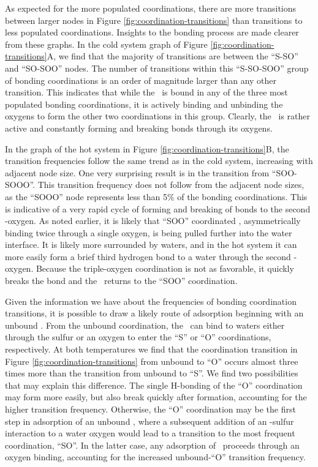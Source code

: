 As expected for the more populated coordinations, there are more transitions between larger nodes in Figure \ref{fig:coordination-transitions} than transitions to less populated coordinations. Insights to the bonding process are made clearer from these graphs. In the cold system graph of Figure \ref{fig:coordination-transitions}A, we find that the majority of transitions are between the ``S-SO'' and ``SO-SOO'' nodes. The number of transitions within this ``S-SO-SOO'' group of bonding coordinations is an order of magnitude larger than any other transition. This indicates that while the \suldiox~is bound in any of the three most populated bonding coordinations, it is actively binding and unbinding the oxygens to form the other two coordinations in this group. Clearly, the \suldiox~is rather active and constantly forming and breaking bonds through its oxygens.

In the graph of the hot system in Figure \ref{fig:coordination-transitions}B, the transition frequencies follow the same trend as in the cold system, increasing with adjacent node size. One very surprising result is in the transition from ``SOO-SOOO''. This transition frequency does not follow from the adjacent node sizes, as the ``SOOO'' node represents less than 5\% of the bonding coordinations. This is indicative of a very rapid cycle of forming and breaking of bonds to the second \suldiox-oxygen. As noted earlier, it is likely that ``SOO'' coordinated \suldiox, asymmetrically binding twice through a single oxygen, is being pulled further into the water interface. It is likely more surrounded by waters, and in the hot system it can more easily form a brief third hydrogen bond to a water through the second \suldiox-oxygen. Because the triple-oxygen coordination is not as favorable, it quickly breaks the bond and the \suldiox~returns to the ``SOO'' coordination.

Given the information we have about the frequencies of bonding coordination transitions, it is possible to draw a likely route of adsorption beginning with an unbound \suldiox. From the unbound coordination, the \suldiox~can bind to waters either through the sulfur or an oxygen to enter the ``S'' or ``O'' coordinations, respectively. At both temperatures we find that the coordination transition in Figure \ref{fig:coordination-transitions} from unbound to ``O'' occurs almost three times more than the transition from unbound to ``S''. We find two possibilities that may explain this difference. The single H-bonding of the ``O'' coordination may form more easily, but also break quickly after formation, accounting for the higher transition frequency. Otherwise, the ``O'' coordination may be the first step in adsorption of an unbound \suldiox, where a subsequent addition of an \suldiox-sulfur interaction to a water oxygen would lead to a transition to the most frequent coordination, ``SO''. In the latter case, any adsorption of \suldiox~proceeds through an oxygen binding, accounting for the increased unbound-``O'' transition frequency.

